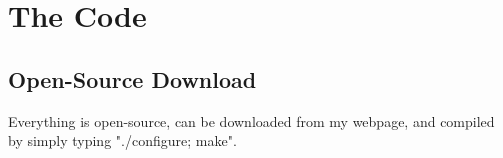 \chapter{The Code}\label{appendix:the_code}

\section{Open-Source Download}

Everything is open-source, can be downloaded from my webpage, and
compiled by simply typing "./configure; make".
